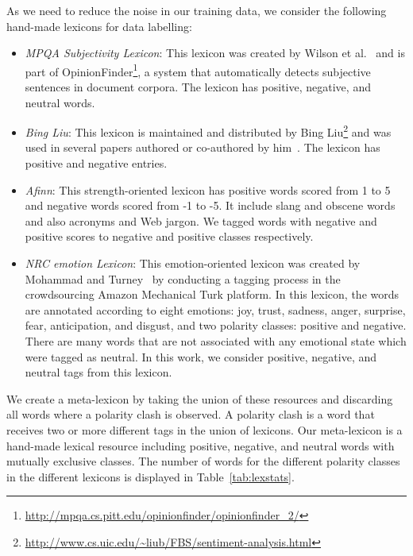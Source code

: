 \documentclass{sig-alternate}
\begin{document}
As we need to reduce the noise in our training data, we consider the following hand-made lexicons for data labelling:
\begin{itemize}
\item \emph{MPQA Subjectivity Lexicon}:  This lexicon was created by Wilson et al.~\cite{Wilson2005} and is part of OpinionFinder\footnote{\url{http://mpqa.cs.pitt.edu/opinionfinder/opinionfinder_2/}}, a system that automatically detects subjective sentences in document corpora. The lexicon has positive, negative, and neutral words. 
\item \emph{Bing Liu}: This lexicon is maintained and distributed by Bing
Liu\footnote{\url{http://www.cs.uic.edu/~liub/FBS/sentiment-analysis.html}} and
was used in several papers authored or co-authored by him~\cite{LiuBook}. The lexicon has positive and negative entries. 
\item \emph{Afinn}:  This strength-oriented lexicon \cite{Finn2011} has positive words scored from 1 to 5 and negative words scored from -1 to -5. It include slang and obscene words and also acronyms and Web jargon. We tagged words with negative and positive scores to   negative and positive classes respectively.
\item \emph{NRC emotion Lexicon}: This emotion-oriented lexicon was created by Mohammad and Turney~\cite{Saaif2012}  by conducting a tagging process in the crowdsourcing Amazon Mechanical Turk platform. In this lexicon, the words are annotated according to eight emotions: joy, trust, sadness, anger, surprise, fear, anticipation, and disgust, and two polarity classes: positive and negative. There are many words that are not associated with any emotional state which were tagged as neutral. In this work, we consider positive, negative, and neutral tags from this lexicon. 
\end{itemize}

We create a meta-lexicon by taking the union of these resources and discarding all words where a polarity clash is observed. A polarity clash is a word that receives two or more different tags in the union of lexicons. Our meta-lexicon is a hand-made lexical resource including positive, negative, and neutral words with mutually exclusive classes. The number of words for the different polarity classes in the different lexicons is displayed in Table~\ref{tab:lexstats}.   
\end{document}
